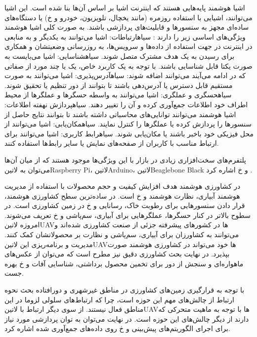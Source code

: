اشیا هوشمند پایه‌هایی هستند که اینترنت اشیا بر اساس آن‌ها بنا شده است. این اشیا می‌توانند، اشیایی با استفاده روزمره (مانند یخچال، تلویزیون، خودرو و ‌خ) یا دستگاه‌های ساده‌ای مجهز به
سنسورها و قابلیت‌های پردازشی باشند. به صورت کلی اشیا هوشمند ویژگی‌های اساسی زیر را دارند
:
 ‌سیاه{ارتباطات}: اشیا می‌توانند به یکدیگر و به منابعی در اینترنت در جهت استفاده از داده‌ها و سرویس‌ها، به روزرسانی وضعیتشان و همکاری برای رسیدن به یک هدف مشترک متصل شوند.
 ‌سیاه{شناسایی}: اشیا می‌بایست به صورت یکتا قابل شناسایی باشند.
با توجه به یک کاربرد خاص، یک یا چند مورد از صفاتی که در ادامه می‌آیند می‌توانند اضافه شوند:
 ‌سیاه{آدرس‌پذیری}: اشیا می‌توانند به صورت مستقیم قابل دسترس یا آدرس‌دهی باشند تا بتوانند از دور تنظیم یا تحقیق شوند.
 ‌سیاه{حسگری و عملگری}: اشیا می‌توانند به واسطه حسگرها و عملگرها از محیط اطراف خود اطلاعات جمع‌آوری کرده و آن را تغییر دهند.
 ‌سیاه{پردازش نهفته اطلاعات}: اشیا هوشمند می‌توانند توانایی‌های محاسباتی داشته باشند تا بتوانند نتایج حاصل از سنسورها را پردازش کرده یا عملگرها را کنترل نمایند.
 ‌سیاه{مکان‌یابی}: اشیا می‌توانند از محل فیزیکی خود باخبر باشند یا مکان‌یابی شوند.
 ‌سیاه{رابط کاربری}: اشیا می‌توانند برای ارتباط مناسب با کاربران از صفحه‌های نمایش یا سایر رابط‌ها استفاده کنند.

پلتفرم‌های سخت‌افزاری زیادی در بازار با این ویژگی‌ها موجود هستند که از میان آن‌ها می‌توان به ‌لاتین{Raspberry Pi}، ‌لاتین{Arduino}، ‌لاتین{Beaglebone Black} و ‌خ اشاره کرد
.



در کشاورزی هوشمند هدف افزایش کیفیت و حجم محصولات با استفاده از مدیریت هوشمند آبیاری، نظارت هوشمند و ‌خ است.
در ساده‌ترین سطح کشاورزی هوشمند، قرار دادن سنسورهایی برای رطوبت خاک، رسانایی و ‌خ در زمین کشاورزی است. در سطوح بالاتر در کنار حسگرها، عملگرهایی برای آبیاری، سم‌پاشی و ‌خ تعریف می‌شوند.
امروزه ‌لاتین{UAV}ها در کشورهای پیشرفته جزئی از صنعت کشاورزی شده‌اند و می‌توانند به کشاورزان برای آبیاری، سم‌پاشی و نظارت بر محصولاتشان کمک کنند. مدیریت و برنامه‌ریزی این ‌لاتین{UAV}ها خود می‌تواند
در کشاورزی هوشمند صورت بپذیرد. در نهایت بحث کشاورزی دقیق نیز مطرح است که می‌توان از عکس‌های ماهواره‌ای و سنجش از دور برای تخمین محصول برداشتی، شناسایی آفات و ‌خ بهره جست.

با توجه به قرارگیری زمین‌های کشاورزی در مناطق غیرشهری و دورافتاده بحث نحوه ارتباط از چالش‌های مهم این حوزه است، چرا که ارتباط‌های سلولی لزوما در این مناطق فعال نیستند.
از سوی دیگر ارتباط با ‌لاتین{UAV}ها با توجه به ماهیت متحرکی که دارند از دیگر چالش‌های این حوزه است. در نهایت می‌توان به توان پردازشی مورد نیاز برای اجرای الگوریتم‌های پیش‌بینی
و ‌خ روی داده‌های جمع‌آوری شده اشاره کرد.

